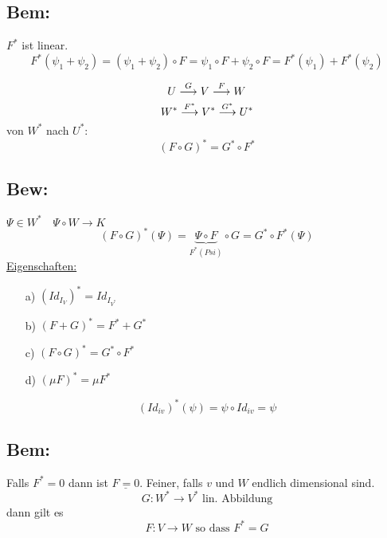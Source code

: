 \documentclass[titlepage,12pt,a4paper,ngerman]{report}
\newcommand{\tx}[1]{\textrm{#1}}
\newcommand{\ub}[1]{\underbrace{#1}}
\begin{document}
\subsection*{Bem:}
$F^*$ ist linear. 
$$F^* (\psi_1 + \psi_2) = (\psi_1 + \psi_2) \circ F = \psi_1 \circ F + \psi_2 \circ F = F^* (\psi_1) + F^* (\psi_2)$$

$$ U \buildrel G \over \longrightarrow V \buildrel F \over \longrightarrow W$$
$$ W^* \buildrel F^* \over \longrightarrow V^* \buildrel G^* \over \longrightarrow U^*$$
von $ W^* $ nach $ U^* $:
$$(F\circ G)^* = G^* \circ F^*$$
\subsection{Bew:} $ \Psi \in W^* \quad \Psi \circ W \to K $ 
$$(F \circ G)^*(\Psi) = \ub{\Psi\circ F}_{F^*(Psi)} \circ G = G^* \circ F^*(\Psi)$$
\underline{Eigenschaften:}
\begin{itemize}
	\item[a)] $ (Id_{I_{V}})^* = Id_{I_{V^*}} $
	\item[b)] $ (F+G)^* = F^* + G^* $
	\item[c)] $ (F\circ G)^* = G^* \circ F^* $
	\item[d)] $ (\mu F)^* = \mu F^* $
\end{itemize}

$$(Id_{iv})^* (\psi) = \psi \circ Id_{iv} = \psi$$
\subsection*{Bem:} Falls $F^* =0$ dann ist $\underline{F = 0}$. Feiner, falls $v$ und $W$ endlich dimensional sind.
$$G: W^* \to V^* \tx{ lin. Abbildung}$$ dann gilt es $$F: V \to W \tx{ so dass } F^* = G$$
\end{document}
